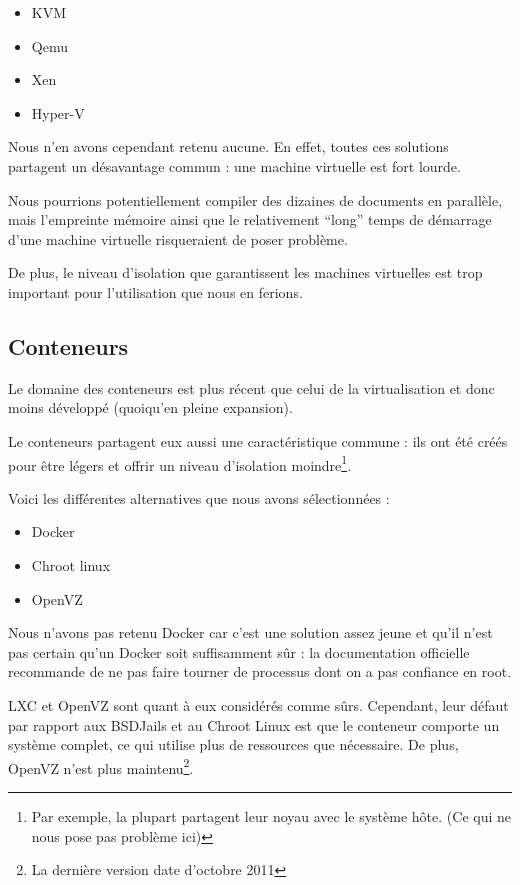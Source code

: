 \documentclass[10pt,a4paper]{article}
\begin{document}
\begin{itemize}
    \item{KVM}
    \item{Qemu}
    \item{Xen}
    \item{Hyper-V}
\end{itemize}

Nous n'en avons cependant retenu aucune. En effet, toutes ces solutions partagent un désavantage commun : une machine virtuelle est fort lourde.

Nous pourrions potentiellement compiler des dizaines de documents en parallèle, mais l'empreinte mémoire ainsi que le relativement ``long'' temps de démarrage d'une machine virtuelle risqueraient de poser problème.

De plus, le niveau d'isolation que garantissent les machines virtuelles est trop important pour l'utilisation que nous en ferions.

\subsection{Conteneurs}
Le domaine des conteneurs est plus récent que celui de la virtualisation et donc moins développé (quoiqu'en pleine expansion).

Le conteneurs partagent eux aussi une caractéristique commune : ils ont été créés pour être légers et offrir un niveau d'isolation moindre\footnote{Par exemple, la plupart partagent leur noyau avec le système hôte. (Ce qui ne nous pose pas problème ici)}.

Voici les différentes alternatives que nous avons sélectionnées :

\begin{itemize}
    \item{Docker}
    \item{Chroot linux}
    \item{OpenVZ}
\end{itemize}

Nous n'avons pas retenu Docker car c'est une solution assez jeune et qu'il n'est pas certain qu'un Docker soit suffisamment sûr : la documentation officielle recommande de ne pas faire tourner de processus dont on a pas confiance en root.

LXC et OpenVZ sont quant à eux considérés comme sûrs.
Cependant, leur défaut par rapport aux BSDJails et au Chroot Linux est que le conteneur comporte un système complet, ce qui utilise plus de ressources que nécessaire.
De plus, OpenVZ n'est plus maintenu\footnote{La dernière version date d'octobre 2011}.
\end{document}
